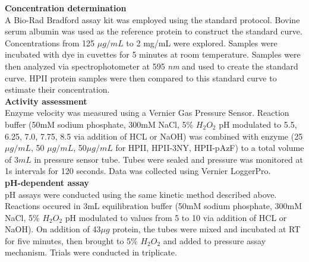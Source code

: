 \documentclass[journal=jacsat,manuscript=article]{achemso}
\begin{document}
\textbf{Concentration determination}\\
A Bio-Rad Bradford assay kit was employed using the standard protocol. Bovine serum albumin was used as the reference protein to construct the standard curve. Concentrations from 125 $\mu g / mL$ to 2 mg/mL were explored. Samples were incubated with dye in cuvettes for 5 minutes at room temperature. Samples were then analyzed via spectrophotometer at 595 \textit{nm} and used to create the standard curve. HPII protein samples were then compared to this standard curve to estimate their concentration.\\

\textbf{Activity assessment}\\
Enzyme velocity was measured using a Vernier Gas Pressure Sensor. Reaction buffer (50mM sodium phosphate, 300mM NaCl, 5\% $H_2O_2$ pH modulated to 5.5, 6.25, 7.0, 7.75, 8.5 via addition of HCL or NaOH) was combined with enzyme (25 $\mu g/mL$, 50 $\mu g/mL$, 50$\mu g/mL$ for HPII, HPII-3NY, HPII-pAzF) to a total volume of $3mL$ in pressure sensor tube. Tubes were sealed and pressure was monitored at 1s intervals for 120 seconds. Data was collected using Vernier LoggerPro.\\

\textbf{pH-dependent assay}\\
pH assays were conducted using the same kinetic method described above. Reactions occured in 3mL equilibration buffer (50mM sodium phosphate, 300mM NaCl, 5\% $H_2O_2$ pH modulated to values from 5 to 10 via addition of HCL or NaOH). On addition of 43$\mu g$ protein, the tubes were mixed and incubated at RT for five minutes, then brought to 5\% $H_2O_2$ and added to pressure assay mechanism. Trials were conducted in triplicate.\\
\end{document}
